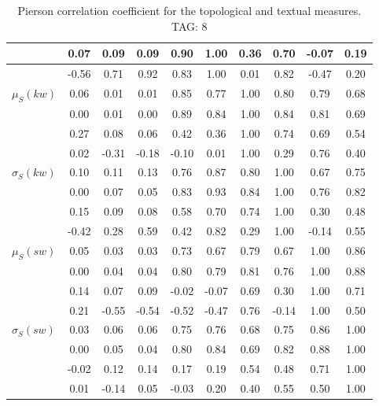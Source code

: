 \begin{table*}[h!]
\begin{center}
\begin{tabular}{| l | c | c | c | c | c | c | c | c | c |}
 & 0.07  & 0.09  & 0.09  & 0.90  & 1.00  & 0.36  & 0.70  & -0.07  & 0.19 \\\hline
 & -0.56  & 0.71  & 0.92  & 0.83  & 1.00  & 0.01  & 0.82  & -0.47  & 0.20 \\\hline
$\mu_S(kw)$ & 0.06  & 0.01  & 0.01  & 0.85  & 0.77  & 1.00  & 0.80  & 0.79  & 0.68 \\\hline
 & 0.00  & 0.01  & 0.00  & 0.89  & 0.84  & 1.00  & 0.84  & 0.81  & 0.69 \\\hline
 & 0.27  & 0.08  & 0.06  & 0.42  & 0.36  & 1.00  & 0.74  & 0.69  & 0.54 \\\hline
 & 0.02  & -0.31  & -0.18  & -0.10  & 0.01  & 1.00  & 0.29  & 0.76  & 0.40 \\\hline
$\sigma_S(kw)$ & 0.10  & 0.11  & 0.13  & 0.76  & 0.87  & 0.80  & 1.00  & 0.67  & 0.75 \\\hline
 & 0.00  & 0.07  & 0.05  & 0.83  & 0.93  & 0.84  & 1.00  & 0.76  & 0.82 \\\hline
 & 0.15  & 0.09  & 0.08  & 0.58  & 0.70  & 0.74  & 1.00  & 0.30  & 0.48 \\\hline
 & -0.42  & 0.28  & 0.59  & 0.42  & 0.82  & 0.29  & 1.00  & -0.14  & 0.55 \\\hline
$\mu_S(sw)$ & 0.05  & 0.03  & 0.03  & 0.73  & 0.67  & 0.79  & 0.67  & 1.00  & 0.86 \\\hline
 & 0.00  & 0.04  & 0.04  & 0.80  & 0.79  & 0.81  & 0.76  & 1.00  & 0.88 \\\hline
 & 0.14  & 0.07  & 0.09  & -0.02  & -0.07  & 0.69  & 0.30  & 1.00  & 0.71 \\\hline
 & 0.21  & -0.55  & -0.54  & -0.52  & -0.47  & 0.76  & -0.14  & 1.00  & 0.50 \\\hline
$\sigma_S(sw)$ & 0.03  & 0.06  & 0.06  & 0.75  & 0.76  & 0.68  & 0.75  & 0.86  & 1.00 \\\hline
 & 0.00  & 0.05  & 0.04  & 0.80  & 0.84  & 0.69  & 0.82  & 0.88  & 1.00 \\\hline
 & -0.02  & 0.12  & 0.14  & 0.17  & 0.19  & 0.54  & 0.48  & 0.71  & 1.00 \\\hline
 & 0.01  & -0.14  & 0.05  & -0.03  & 0.20  & 0.40  & 0.55  & 0.50  & 1.00 \\\hline
\end{tabular}
\caption{Pierson correlation coefficient for the topological and textual measures. TAG: 8}
\end{center}
\end{table*}